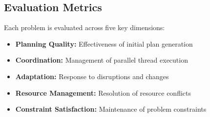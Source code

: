 \subsection{Evaluation Metrics}
Each problem is evaluated across five key dimensions:
\begin{itemize}[leftmargin=1.0em, topsep=-.0em, parsep=-.0em, label=-]
   \item \textbf{Planning Quality:} Effectiveness of initial plan generation
   \item \textbf{Coordination:} Management of parallel thread execution
   \item \textbf{Adaptation:} Response to disruptions and changes
   \item \textbf{Resource Management:} Resolution of resource conflicts
   \item \textbf{Constraint Satisfaction:} Maintenance of problem constraints
\end{itemize}
